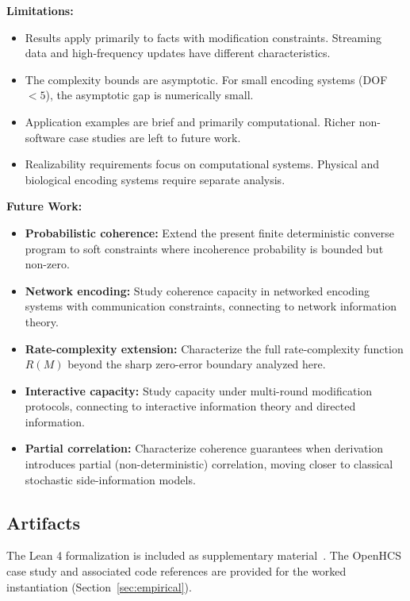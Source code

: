\textbf{Limitations:}
\begin{itemize}
\tightlist
\item Results apply primarily to facts with modification constraints. Streaming data and high-frequency updates have different characteristics.
\item The complexity bounds are asymptotic. For small encoding systems (DOF $< 5$), the asymptotic gap is numerically small.
\item Application examples are brief and primarily computational. Richer non-software case studies are left to future work.
\item Realizability requirements focus on computational systems. Physical and biological encoding systems require separate analysis.
\end{itemize}

\textbf{Future Work:}
\begin{itemize}
\tightlist
\item \textbf{Probabilistic coherence:} Extend the present finite deterministic converse program to soft constraints where incoherence probability is bounded but non-zero.
\item \textbf{Network encoding:} Study coherence capacity in networked encoding systems with communication constraints, connecting to network information theory.
\item \textbf{Rate-complexity extension:} Characterize the full rate-complexity function $R(M)$ beyond the sharp zero-error boundary analyzed here.
\item \textbf{Interactive capacity:} Study capacity under multi-round modification protocols, connecting to interactive information theory and directed information.
\item \textbf{Partial correlation:} Characterize coherence guarantees when derivation introduces partial (non-deterministic) correlation, moving closer to classical stochastic side-information models.
\end{itemize}

\subsection{Artifacts}\label{sec:data-availability}

The Lean 4 formalization is included as supplementary material~\cite{openhcsLeanProofs}. The OpenHCS case study and associated code references are provided for the worked instantiation (Section~\ref{sec:empirical}).
